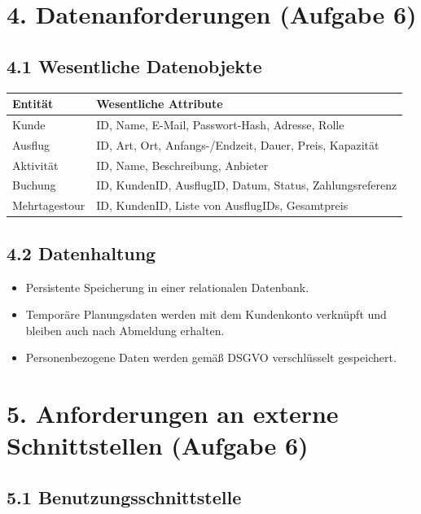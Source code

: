 \documentclass[
	fontsize=12pt,          %
	paper=a4,               %
	numbers=noenddot,       %
	listof=totoc,           %
	listof=entryprefix,     %
	listof=nochaptergap,    %
	bibliography=totoc,     %
	parskip=half,           %
	openany                 %
]{scrbook}
\begin{document}
\chapter*{4. Datenanforderungen \normalfont\normalsize(Aufgabe 6)}


\section*{4.1 Wesentliche Datenobjekte}

\begin{tabular}{| p{3.5cm} | p{10cm} |}
	\hline
	\textbf{Entität} & \textbf{Wesentliche Attribute} \\ \hline
	Kunde & ID, Name, E-Mail, Passwort-Hash, Adresse, Rolle \\ \hline
	Ausflug & ID, Art, Ort, Anfangs-/Endzeit, Dauer, Preis, Kapazität \\ \hline
	Aktivität & ID, Name, Beschreibung, Anbieter \\ \hline
	Buchung & ID, KundenID, AusflugID, Datum, Status, Zahlungsreferenz \\ \hline
	Mehrtagestour & ID, KundenID, Liste von AusflugIDs, Gesamtpreis \\ \hline
\end{tabular}


\section*{4.2 Datenhaltung}

\begin{itemize}
	\item Persistente Speicherung in einer relationalen Datenbank.
	\item Temporäre Planungsdaten werden mit dem Kundenkonto verknüpft und bleiben auch nach Abmeldung erhalten.
	\item Personenbezogene Daten werden gemäß DSGVO verschlüsselt gespeichert.
\end{itemize}


\chapter*{5. Anforderungen an externe Schnittstellen \normalfont\normalsize(Aufgabe 6)}


\section*{5.1 Benutzungsschnittstelle}
\end{document}
